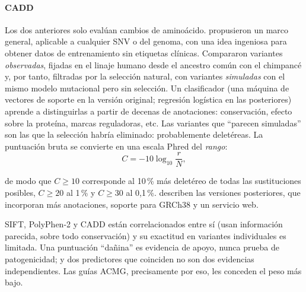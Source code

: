 \paragraph{CADD} Los dos anteriores solo evalúan cambios de aminoácido. \textcite{c09-kircher2014} propusieron un marco general, aplicable a cualquier SNV o  del genoma, con una idea ingeniosa para obtener datos de entrenamiento sin etiquetas clínicas. Compararon variantes \emph{observadas}, fijadas en el linaje humano desde el ancestro común con el chimpancé y, por tanto, filtradas por la selección natural, con variantes \emph{simuladas} con el mismo modelo mutacional pero sin selección. Un clasificador (una máquina de vectores de soporte en la versión original; regresión logística en las posteriores) aprende a distinguirlas a partir de decenas de anotaciones: conservación, efecto sobre la proteína, marcas reguladoras, etc. Las variantes que ``parecen simuladas'' son las que la selección habría eliminado: probablemente deletéreas. La puntuación bruta se convierte en una escala Phred del \emph{rango}:
\begin{equation}\label{eq:09-cadd}
C = -10\log_{10}\frac{r}{N},
\end{equation}

\begin{simbolos}
\end{simbolos}

de modo que $C\ge10$ corresponde al 10\,\% más deletéreo de todas las sustituciones posibles, $C\ge20$ al 1\,\% y $C\ge30$ al 0,1\,\%. \textcite{c09-rentzsch2019} describen las versiones posteriores, que incorporan más anotaciones, soporte para GRCh38 y un servicio web.

\begin{cuidado}
SIFT, PolyPhen-2 y CADD están correlacionados entre sí (usan información parecida, sobre todo conservación) y su exactitud en variantes individuales es limitada. Una puntuación ``dañina'' es evidencia de apoyo, nunca prueba de patogenicidad; y dos predictores que coinciden no son dos evidencias independientes. Las guías ACMG, precisamente por eso, les conceden el peso más bajo.
\end{cuidado}

